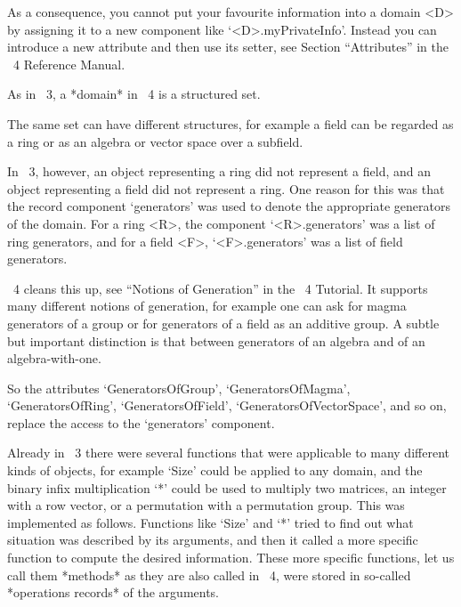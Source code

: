 As a consequence, you cannot put your favourite information into a
domain <D> by assigning it to a new component like
`<D>.myPrivateInfo'.  Instead you can introduce a new attribute and
then use its setter,
see Section ``Attributes'' in the {\GAP}~4 Reference Manual.



As in {\GAP}~3, a *domain* in {\GAP}~4 is a structured set.

The same set can have different structures, for example a field can be
regarded as a ring or as an algebra or vector space over a subfield.

In {\GAP}~3, however, an object representing a ring did not represent
a field, and an object representing a field did not represent a ring.
One reason for this was that the record component `generators' was
used to denote the appropriate generators of the domain.  For a ring
<R>, the component `<R>.generators' was a list of ring generators, and
for a field <F>, `<F>.generators' was a list of field generators.

{\GAP}~4 cleans this up,
see ``Notions of Generation'' in the {\GAP}~4 Tutorial.  It supports
many different notions of generation, for example one can ask for
magma generators of a group or for generators of a field as an additive
group.  A subtle but important distinction is that between generators
of an algebra and of an algebra-with-one.

So the attributes `GeneratorsOfGroup', `GeneratorsOfMagma',
`GeneratorsOfRing', `GeneratorsOfField', `GeneratorsOfVectorSpace',
and so on, replace the access to the `generators' component.



Already in {\GAP}~3 there were several functions that were applicable
to many different kinds of objects, for example `Size' could be
applied to any domain, and the binary infix multiplication `*' could
be used to multiply two matrices, an integer with a row vector, or a
permutation with a permutation group.  This was implemented as
follows.  Functions like `Size' and `*' tried to find out what
situation was described by its arguments, and then it called a more
specific function to compute the desired information.  These more
specific functions, let us call them *methods* as they are also called
in {\GAP}~4, were stored in so-called *operations records* of the
arguments.

